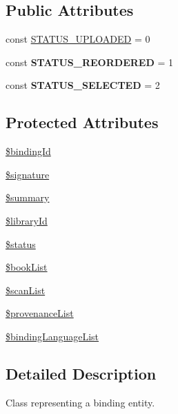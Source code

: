 \subsection*{Public Attributes}
\begin{DoxyCompactItemize}
\item 
const \hyperlink{classBinding_a501dc5e8d8952bcbd5d022a299c416fd}{STATUS\_\-UPLOADED} = 0
\item 
\hypertarget{classBinding_ab7bcbaf41004f7eb5df3fee0316f0be1}{
const {\bfseries STATUS\_\-REORDERED} = 1}
\label{classBinding_ab7bcbaf41004f7eb5df3fee0316f0be1}

\item 
\hypertarget{classBinding_a4cd41675d4a2d1683981fce67de2b641}{
const {\bfseries STATUS\_\-SELECTED} = 2}
\label{classBinding_a4cd41675d4a2d1683981fce67de2b641}

\end{DoxyCompactItemize}
\subsection*{Protected Attributes}
\begin{DoxyCompactItemize}
\item 
\hyperlink{classBinding_ac145987d9c0aca2442c63a92a085ef03}{\$bindingId}
\item 
\hyperlink{classBinding_a508680736126fbd926d7f6ba9aeed585}{\$signature}
\item 
\hyperlink{classBinding_ae960edd7ba2a427c3853936f0e1a380e}{\$summary}
\item 
\hyperlink{classBinding_a9e88a985a9d2097135f01ef49a1c3114}{\$libraryId}
\item 
\hyperlink{classBinding_a1320ef2d72d40ce811c675afc602929a}{\$status}
\item 
\hyperlink{classBinding_abf327f008d27256a4756e6e08819d87b}{\$bookList}
\item 
\hyperlink{classBinding_a1ba6844e15978a1136a50632f30e29b6}{\$scanList}
\item 
\hyperlink{classBinding_a9f4c618edbd6df5e1972aae7350e37d4}{\$provenanceList}
\item 
\hyperlink{classBinding_a9ef17d4d6732c18b6a3ac4b48483ef90}{\$bindingLanguageList}
\end{DoxyCompactItemize}


\subsection{Detailed Description}
Class representing a binding entity. 


